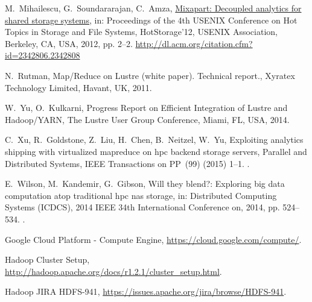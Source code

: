 \documentclass[preprint,12pt]{elsarticle}
\begin{document}
\begin{thebibliography}{10}
M.~Mihailescu, G.~Soundararajan, C.~Amza,
  \href{http://dl.acm.org/citation.cfm?id=2342806.2342808}{Mixapart: Decoupled
  analytics for shared storage systems}, in: Proceedings of the 4th USENIX
  Conference on Hot Topics in Storage and File Systems, HotStorage'12, USENIX
  Association, Berkeley, CA, USA, 2012, pp. 2--2.
\newline\urlprefix\url{http://dl.acm.org/citation.cfm?id=2342806.2342808}

N.~Rutman, {Map/Reduce on Lustre (white paper). Technical report.}, Xyratex
  Technology Limited, Havant, UK, 2011.

W.~Yu, O.~Kulkarni, {Progress Report on Efficient Integration of Lustre and
  Hadoop/YARN}, The Lustre User Group Conference, Miami, FL, USA, 2014.

C.~Xu, R.~Goldstone, Z.~Liu, H.~Chen, B.~Neitzel, W.~Yu, Exploiting analytics
  shipping with virtualized mapreduce on hpc backend storage servers, Parallel
  and Distributed Systems, IEEE Transactions on PP~(99) (2015) 1--1.
\newblock \href {http://dx.doi.org/10.1109/TPDS.2015.2389262}
  {}.

E.~Wilson, M.~Kandemir, G.~Gibson, Will they blend?: Exploring big data
  computation atop traditional hpc nas storage, in: Distributed Computing
  Systems (ICDCS), 2014 IEEE 34th International Conference on, 2014, pp.
  524--534.
\newblock \href {http://dx.doi.org/10.1109/ICDCS.2014.60}
  {}.

{Google Cloud Platform - Compute Engine},
  \url{https://cloud.google.com/compute/}.

{Hadoop Cluster Setup},
  \url{http://hadoop.apache.org/docs/r1.2.1/cluster\_setup.html}.

{Hadoop JIRA HDFS-941}, \url{https://issues.apache.org/jira/browse/HDFS-941}.

\end{thebibliography}
\end{document}
